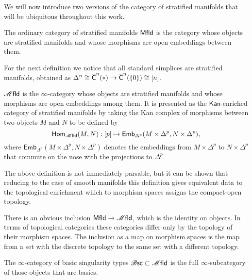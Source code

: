 \documentclass[../text]{subfiles}
\begin{document}
We will now introduce two versions of the category of stratified manifolds that will be ubiquitous throughout this work.

\begin{definition}
    The ordinary category of stratified manifolds $\mfld[r]$ is the category whose objects are stratified manifolds and whose morphisms are open embeddings between them.
\end{definition}

For the next definition we notice that all standard simplices are stratified manifolds, obtained as $\Delta^n \cong \cone[b]^n(\ast) \to \cone[b]^n(\{0\}) \cong [n]$.

\begin{definition}\label{def:mfld_infty_cat}
    $\mfld$ is the $\infty$-category whose objects are stratified manifolds and whose morphisms are open embeddings among them. It is presented as the $\mathsf{Kan}$-enriched category of stratified manifolds by taking the Kan complex of morphisms between two objects $M$ and $N$ to be defined by
    \begin{equation}
        \mathsf{Hom}_{\mfld} (M, N): [p] \mapsto \mathsf{Emb}_{\Delta^p} (M \times \Delta^p, N \times \Delta^p),
    \end{equation}
    where $\mathsf{Emb}_{\Delta^p} (M \times \Delta^p, N \times \Delta^p)$ denotes the embeddings from $M \times \Delta^p$ to $N \times \Delta^p$ that commute on the nose with the projections to $\Delta^p$.
\end{definition}

\begin{remark}
    The above definition is not immediately parsable, but it can be shown that reducing to the case of smooth manifolds this definition gives equivalent data to the topological enrichment which to morphism spaces assigns the compact-open topology. 
\end{remark}

\begin{remark}
    There is an obvious inclusion $\mfld[r] \xrightarrow{} \mfld$, which is the identity on objects. In terms of topological categories these categories differ only by the topology of their morphism spaces. The inclusion as a map on morphism spaces is the map from a set with the discrete topology to the same set with a different topology.
\end{remark}

\begin{definition}
    The $\infty$-category of basic singularity types $\bsc \subset \mfld$ is the full $\infty$-subcategory of those objects that are basics.
\end{definition}
\end{document}
